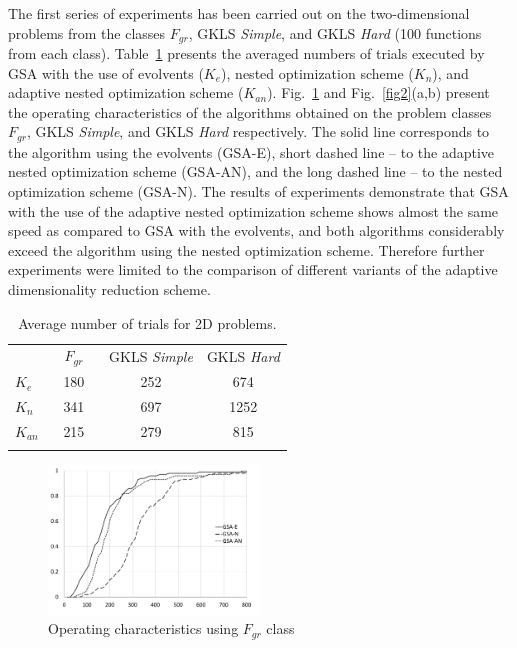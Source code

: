 \documentclass[runningheads]{llncs}
\begin{document}
The first series of experiments has been carried out on the two-dimensional problems from the classes $F_{gr}$, GKLS 
\textit{Simple}, and GKLS \textit{Hard} (100 functions from each class). Table~\ref{tab1} presents the averaged 
numbers of trials executed by GSA with the use of evolvents ($K_e$), nested optimization scheme ($K_n$), and adaptive 
nested optimization scheme ($K_{an}$). Fig.~\ref{fig1} and Fig.~\ref{fig2}(a,b) present the operating characteristics of the 
algorithms obtained on the problem classes $F_{gr}$, GKLS \textit{Simple}, and GKLS \textit{Hard} respectively. The solid 
line corresponds to the algorithm using the evolvents (GSA-E), short dashed line -- to the adaptive nested optimization scheme (GSA-AN), and 
the long dashed line -- to the nested optimization scheme (GSA-N). The results of experiments demonstrate that GSA with the use of 
the adaptive nested optimization scheme shows almost the same speed as compared to GSA with the evolvents, and 
both algorithms considerably exceed the algorithm using the nested optimization scheme. Therefore further experiments 
were limited to the comparison of different variants of the adaptive  dimensionality reduction scheme. 

\begin{table}
\centering
\caption{Average number of trials for 2D problems.}\label{tab1}
\begin{tabular}{lccc}
\hline\noalign{\smallskip}
 &  $\;\;\;F_{gr}\;\;\;$  &  GKLS \textit{Simple} &  GKLS \textit{Hard} \\
\noalign{\smallskip}\hline\noalign{\smallskip}
 $K_e$ & 180  & 252 & 674 \\
 $K_n$ & 341  & 697 & 1252 \\
 $K_{an}$ & 215  & 279 & 815 \\
\noalign{\smallskip}\hline
\end{tabular}
\end{table}

\begin{figure}
\centering
\includegraphics[width=0.50\textwidth]{2D.pdf}
\caption{Operating characteristics using $F_{gr}$ class} 
\label{fig1}
\end{figure}
\end{document}

